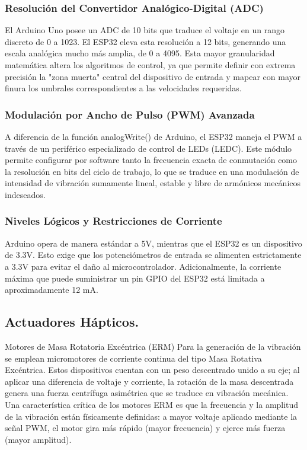 \documentclass[conference]{IEEEtran}
\begin{document}
    \subsubsection{Resolución del Convertidor Analógico-Digital (ADC)}
    El Arduino Uno posee un ADC de 10 bits que traduce el voltaje en un rango discreto de 0 a 1023. El ESP32 eleva esta resolución a 12 bits, generando una escala analógica mucho más amplia, de 0 a 4095. Esta mayor granularidad matemática altera los algoritmos de control, ya que permite definir con extrema precisión la "zona muerta" central del dispositivo de entrada y mapear con mayor finura los umbrales correspondientes a las velocidades requeridas.

    \subsubsection{Modulación por Ancho de Pulso (PWM) Avanzada}
     A diferencia de la función analogWrite() de Arduino, el ESP32 maneja el PWM a través de un periférico especializado de control de LEDs (LEDC). Este módulo permite configurar por software tanto la frecuencia exacta de conmutación como la resolución en bits del ciclo de trabajo, lo que se traduce en una modulación de intensidad de vibración sumamente lineal, estable y libre de armónicos mecánicos indeseados.

     \subsubsection{Niveles Lógicos y Restricciones de Corriente}
     Arduino opera de manera estándar a 5V, mientras que el ESP32 es un dispositivo de 3.3V. Esto exige que los potenciómetros de entrada se alimenten estrictamente a 3.3V para evitar el daño al microcontrolador. Adicionalmente, la corriente máxima que puede suministrar un pin GPIO del ESP32 está limitada a aproximadamente 12 mA.

  \subsection{Actuadores Hápticos.}
  Motores de Masa Rotatoria Excéntrica (ERM) Para la generación de la vibración se emplean micromotores de corriente continua del tipo Masa Rotativa Excéntrica. Estos dispositivos cuentan con un peso descentrado unido a su eje; al aplicar una diferencia de voltaje y corriente, la rotación de la masa descentrada genera una fuerza centrífuga asimétrica que se traduce en vibración mecánica. Una característica crítica de los motores ERM es que la frecuencia y la amplitud de la vibración están físicamente definidas: a mayor voltaje aplicado mediante la señal PWM, el motor gira más rápido (mayor frecuencia) y ejerce más fuerza (mayor amplitud).
\end{document}
